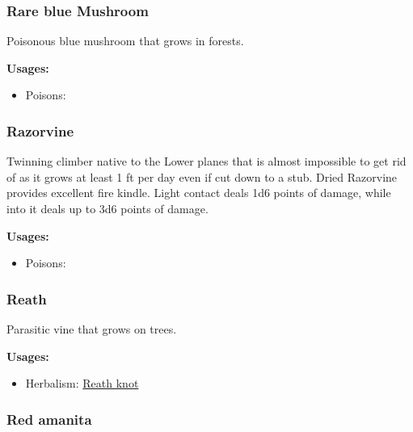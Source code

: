 \subsubsection{Rare blue Mushroom}
\label{Rare blue Mushroom}

Poisonous blue mushroom that grows in forests.

\vspace{5mm}

\textbf{Usages:}

\begin{itemize}[noitemsep]
\item[] Poisons: \poison
\end{itemize}

\subsubsection{Razorvine}
\label{Razorvine}

Twinning climber native to the Lower planes that is almost impossible to get rid of as it grows at least 1 ft per day even if cut down to a stub. Dried Razorvine provides excellent fire kindle. Light contact deals 1d6 points of damage, while into it deals up to 3d6 points of damage.

\vspace{5mm}

\textbf{Usages:}

\begin{itemize}[noitemsep]
\item[] Poisons: \poison
\end{itemize}

\subsubsection{Reath}
\label{Reath}

Parasitic vine that grows on trees.

\vspace{5mm}

\textbf{Usages:}

\begin{itemize}[noitemsep]
\item[] Herbalism: \hyperref[Reath knot]{Reath knot}
\end{itemize}

\subsubsection{Red amanita}
\label{Red amanita}

